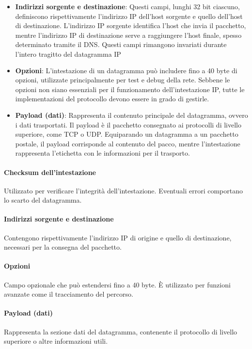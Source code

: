 \documentclass[12pt]{report}
\begin{document}
\begin{itemize}
    \item \textbf{Indirizzi sorgente e destinazione}: Questi campi, lunghi 32 bit ciascuno, definiscono rispettivamente l'indirizzo IP dell'host sorgente e quello dell'host di destinazione. L'indirizzo IP sorgente identifica l'host che invia il pacchetto, mentre l'indirizzo IP di destinazione serve a raggiungere l'host finale, spesso determinato tramite il DNS. Questi campi rimangono invariati durante l'intero tragitto del datagramma IP
	\item \textbf{Opzioni}: L'intestazione di un datagramma può includere fino a 40 byte di opzioni, utilizzate principalmente per test e debug della rete. Sebbene le opzioni non siano essenziali per il funzionamento dell'intestazione IP, tutte le implementazioni del protocollo devono essere in grado di gestirle.
    \item \textbf{Payload (dati)}: Rappresenta il contenuto principale del datagramma, ovvero i dati trasportati. Il payload è il pacchetto consegnato ai protocolli di livello superiore, come TCP o UDP. Equiparando un datagramma a un pacchetto postale, il payload corrisponde al contenuto del pacco, mentre l'intestazione rappresenta l'etichetta con le informazioni per il trasporto.
\end{itemize}



\paragraph{Checksum dell’intestazione}
Utilizzato per verificare l’integrità dell’intestazione. Eventuali errori comportano lo scarto del datagramma.

\paragraph{Indirizzi sorgente e destinazione}
Contengono rispettivamente l’indirizzo IP di origine e quello di destinazione, necessari per la consegna del pacchetto.

\paragraph{Opzioni}
Campo opzionale che può estendersi fino a 40 byte. È utilizzato per funzioni avanzate come il tracciamento del percorso.

\paragraph{Payload (dati)}
Rappresenta la sezione dati del datagramma, contenente il protocollo di livello superiore o altre informazioni utili.
\end{document}
